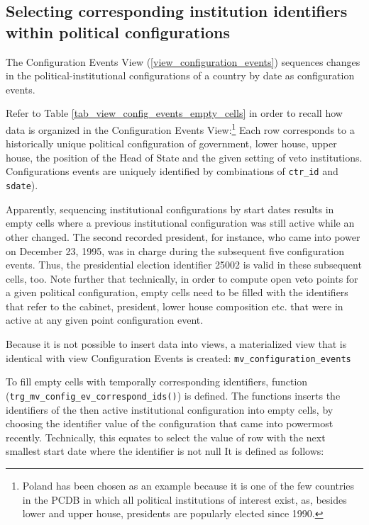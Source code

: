 \subsection{Selecting corresponding institution identifiers within political configurations}\label{subsec_trg_mv_config_ev_corresponding_ids}
The Configuration Events View (\ref{view_configuration_events}) sequences changes in the political-institutional configurations of a country by date as configuration events.


Refer to Table \ref{tab_view_config_events_empty_cells} in order to recall how data is organized in the Configuration Events View:\footnote{%
Poland has been chosen as an example because it is one of the few countries in the PCDB in which all political institutions of interest exist, as, besides lower and upper house, presidents are popularly elected since 1990.}
Each row corresponds to a historically unique political configuration of government, lower house, upper house, the position of the Head of State and the given setting of veto institutions.
Configurations events are uniquely identified by combinations of \texttt{ctr\_id} and \texttt{sdate}). 

Apparently, sequencing institutional configurations by start dates results in empty cells where a previous institutional configuration was still active while an other changed. 
The second recorded president, for instance, who came into power on December 23, 1995, was in charge during the subsequent five configuration events. 
Thus, the presidential election identifier 25002 is valid in these subsequent cells, too.
Note further that technically, in order to compute open veto points for a given political configuration, empty cells need to be filled with the identifiers that refer to the cabinet, president, lower house composition etc. that were in active at any given point configuration event.

Because it is not possible to insert data into views, a materialized view that is identical with view Configuration Events is created: \texttt{mv\_configuration\_events}

To fill empty cells with temporally corresponding identifiers, function (\texttt{trg\_mv\_config\_ev\_correspond\_ids()}) is defined.
The functions inserts the identifiers of the then active institutional configuration into empty cells, by choosing the identifier value of the configuration that came into powermost recently. 
Technically, this equates to select the value of row with the next smallest start date where the identifier is not null
It is defined as follows:

